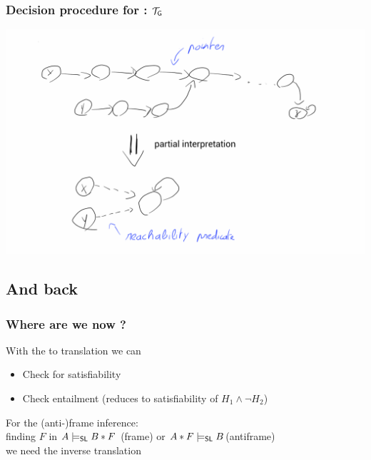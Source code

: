 \documentclass{beamer}
\begin{document}
\begin{frame}
  \frametitle{Decision procedure for \LRJQ: $\mathcal{T}_{\mathsf{G}}$}
  \includegraphics[scale=0.22]{resources/partial.png}
\end{frame}

\subsection{And back}

\begin{frame}
  \frametitle{Where are we now ?}
  With the \JoshLogic to \LRJQ translation we can
  \begin{itemize}
  \item Check for satisfiability
  \item Check entailment (reduces to satisfiability of $H_1 \land \neg H_2$)
  \end{itemize}

  \vspace{2ex}

  For the (anti-)frame inference:\\
  finding $F$ in $A \models_{\mathsf{SL}} B*F$ (frame) or $A*F \models_{\mathsf{SL}} B$(antiframe)\\
  we need the inverse translation
\end{frame}
\end{document}
